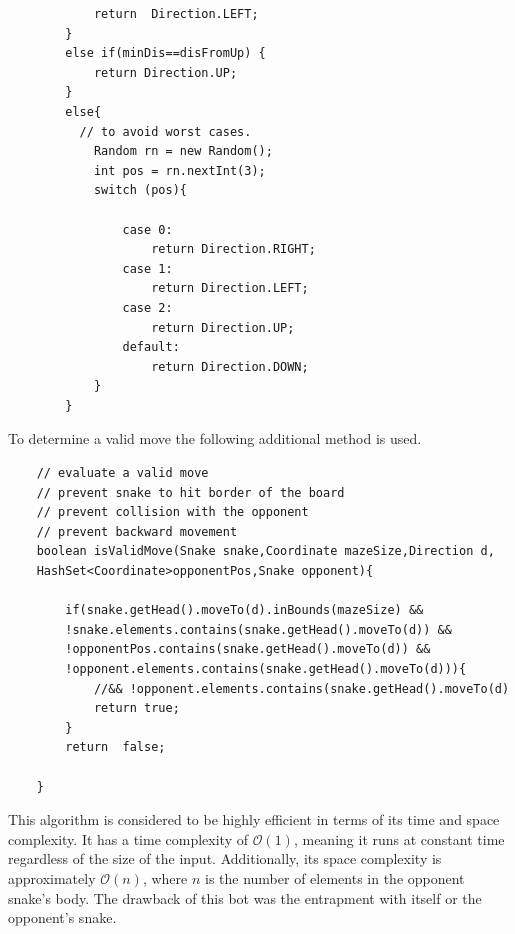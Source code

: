 \documentclass[a4paper,12pt]{article}
\begin{document}
\begin{verbatim}
            return  Direction.LEFT;
        }
        else if(minDis==disFromUp) {
            return Direction.UP;
        }
        else{
          // to avoid worst cases.
            Random rn = new Random();
            int pos = rn.nextInt(3);
            switch (pos){

                case 0:
                    return Direction.RIGHT;
                case 1:
                    return Direction.LEFT;
                case 2:
                    return Direction.UP;
                default:
                    return Direction.DOWN;
            }
        }

\end{verbatim}
To determine a valid move the following additional method is used.
\begin{verbatim}
    // evaluate a valid move
    // prevent snake to hit border of the board
    // prevent collision with the opponent
    // prevent backward movement
    boolean isValidMove(Snake snake,Coordinate mazeSize,Direction d,
	HashSet<Coordinate>opponentPos,Snake opponent){

        if(snake.getHead().moveTo(d).inBounds(mazeSize) && 
		!snake.elements.contains(snake.getHead().moveTo(d)) && 
        !opponentPos.contains(snake.getHead().moveTo(d)) && 
		!opponent.elements.contains(snake.getHead().moveTo(d))){
            //&& !opponent.elements.contains(snake.getHead().moveTo(d)
            return true;
        }
        return  false;

    }
\end{verbatim}
This algorithm is considered to be highly efficient in terms of its time and space complexity. 
It has a time complexity of $\mathcal{O}(1)$, meaning it runs at constant time regardless of the size of the input. 
Additionally, its space complexity is approximately $\mathcal{O}(n)$, where $n$ is the number of elements in the opponent snake's body.
The drawback of this bot was the entrapment with itself or the opponent's snake.
\end{document}
